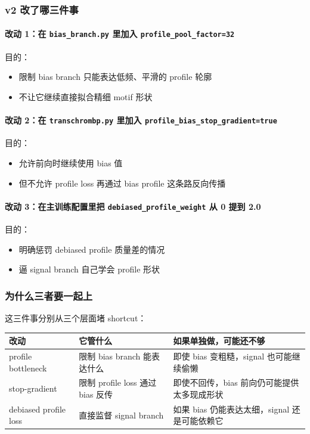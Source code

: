 \documentclass[11pt,a4paper]{ctexart}
\begin{document}
\subsubsection*{v2 改了哪三件事}

\paragraph{改动 1：在 \texttt{bias\_branch.py} 里加入 \texttt{profile\_pool\_factor=32}}

目的：

\begin{itemize}[leftmargin=2em]
\item 限制 bias branch 只能表达低频、平滑的 profile 轮廓
\item 不让它继续直接拟合精细 motif 形状
\end{itemize}

\paragraph{改动 2：在 \texttt{transchrombp.py} 里加入 \texttt{profile\_bias\_stop\_gradient=true}}

目的：

\begin{itemize}[leftmargin=2em]
\item 允许前向时继续使用 bias 值
\item 但不允许 profile loss 再通过 bias profile 这条路反向传播
\end{itemize}

\paragraph{改动 3：在主训练配置里把 \texttt{debiased\_profile\_weight} 从 0 提到 2.0}

目的：

\begin{itemize}[leftmargin=2em]
\item 明确惩罚 debiased profile 质量差的情况
\item 逼 signal branch 自己学会 profile 形状
\end{itemize}

\subsubsection*{为什么三者要一起上}

这三件事分别从三个层面堵 shortcut：

\begin{longtable}{p{} p{} p{}}
\toprule
\textbf{改动} & \textbf{它管什么} & \textbf{如果单独做，可能还不够} \\
\midrule
\endhead
profile bottleneck & 限制 bias branch 能表达什么 & 即使 bias 变粗糙，signal 也可能继续偷懒 \\
stop-gradient & 限制 profile loss 通过 bias 反传 & 即使不回传，bias 前向仍可能提供太多现成形状 \\
debiased profile loss & 直接监督 signal branch & 如果 bias 仍能表达太细，signal 还是可能依赖它 \\
\bottomrule
\end{longtable}
\end{document}
